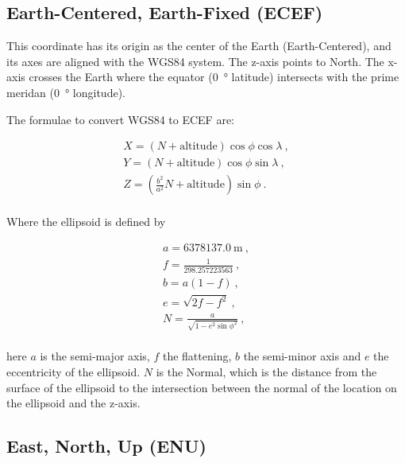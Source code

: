 \subsection{Earth-Centered, Earth-Fixed (ECEF)}

This coordinate has its origin as the center of the Earth
(Earth-Centered), and its axes are aligned with the WGS84 system. The
z-axis points to North. The x-axis crosses the Earth where the equator
(\SI{0}{\degree} latitude) intersects with the prime meridan
(\SI{0}{\degree} longitude).

The formulae to convert WGS84 to ECEF are:

\begin{equation}
    \begin{array}{l}
        X = (N + \mathrm{altitude}) \cos{\phi} \cos{\lambda} \ , \\
        Y = (N + \mathrm{altitude}) \cos{\phi} \sin{\lambda} \ , \\
        Z = (\frac{b^2}{a^2} N + \mathrm{altitude}) \sin{\phi} \ . \\
    \end{array}
\end{equation}

Where the ellipsoid is defined by

\begin{equation}
    \label{eq:wgs84}
    \begin{array}{l}
        a = \SI{6378137.0}{\meter} \ , \\
        f = \frac{1}{298.257223563} \ , \\
        b = a (1 - f) \ , \\
        e = \sqrt{2 f - f^2} \ , \\
        N = \frac{a}{\sqrt{1 - e^2 \sin{\phi}^2}} \ , \\
    \end{array}
\end{equation}

\noindent
here $a$ is the semi-major axis, $f$ the flattening, $b$ the semi-minor
axis and $e$ the eccentricity of the ellipsoid. $N$ is the Normal, which
is the distance from the surface of the ellipsoid to the intersection
between the normal of the location on the ellipsoid and the z-axis.


\subsection{East, North, Up (ENU)}

